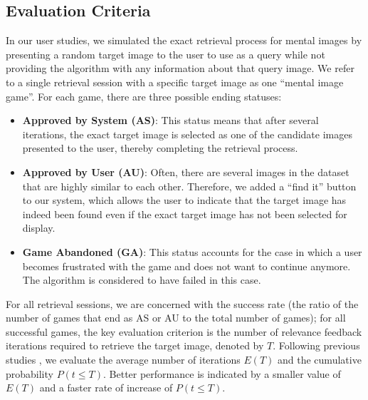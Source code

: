 \documentclass[journal]{IEEEtran}
\begin{document}
\subsection{Evaluation Criteria}
In our user studies, we simulated the exact retrieval process for mental images by presenting a random target image to the user to use as a query while not providing the algorithm with any information about that query image. We refer to a single retrieval session with a specific target image as one ``mental image game''. For each game, there are three possible ending statuses:

\begin{itemize}
\item \textbf{Approved by System (AS)}: This status means that after several iterations, the exact target image is selected as one of the candidate images presented to the user, thereby completing the retrieval process.
\item \textbf{Approved by User (AU)}: Often, there are several images in the dataset that are highly similar to each other. Therefore, we added a ``find it'' button to our system, which allows the user to indicate that the target image has indeed been found even if the exact target image has not been selected for display.
\item \textbf{Game Abandoned (GA)}: This status accounts for the case in which a user becomes frustrated with the game and does not want to continue anymore. The algorithm is considered to have failed in this case.
\end{itemize}

For all retrieval sessions, we are concerned with the success rate (the ratio of the number of games that end as AS or AU to the total number of games); for all successful games, the key evaluation criterion is the number of relevance feedback iterations required to retrieve the target image, denoted by $T$. Following previous studies \cite{fang2005experiments,ferecatu2007interactive}, we evaluate the average number of iterations $E(T)$ and the cumulative probability $P(t\leq T)$. Better performance is indicated by a smaller value of $E(T)$ and a faster rate of increase of $P(t\leq T)$.

\end{document}
